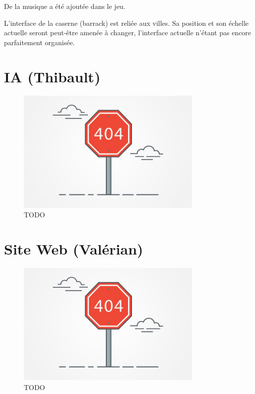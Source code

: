 \documentclass[12pt]{report}
\begin{document}

De la musique a été ajoutée dans le jeu.

L’interface de la caserne (barrack) est reliée aux villes. Sa position et son échelle actuelle seront peut-être amenée à changer, l’interface actuelle n’étant pas encore parfaitement organisée. 

\section{IA (Thibault)}

\begin{figure}[H]
    \centering
    \includegraphics[width=0.8\textwidth]{404}
    \caption{TODO}
\end{figure}

\section{Site Web (Valérian)}

\begin{figure}[H]
    \centering
    \includegraphics[width=0.8\textwidth]{404}
    \caption{TODO}
\end{figure}
\end{document}
